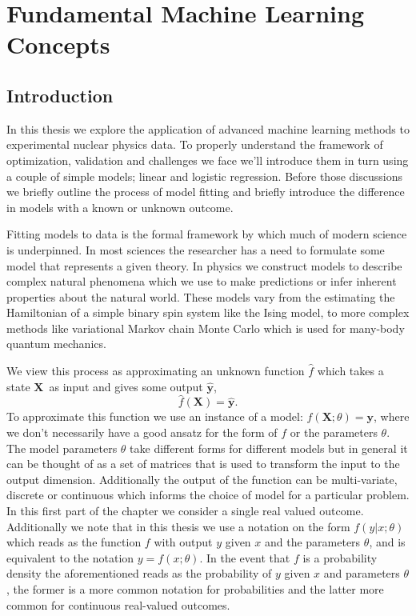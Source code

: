 \chapter{Fundamental Machine Learning Concepts}
\section{Introduction}\label{sec:fundament_intro}

In this thesis we explore the application of advanced machine learning methods to experimental nuclear physics data. To properly understand the framework of optimization, validation and challenges we face we'll introduce them in turn using a couple of simple models; linear and logistic regression. Before those discussions we briefly outline the process of model fitting and briefly introduce the difference in models with a known or unknown outcome.

Fitting models to data is the formal framework by which much of modern science is underpinned. In most sciences the researcher has a need to formulate some model that represents a given theory. In physics we construct models to describe complex natural phenomena which we use to make predictions or infer inherent properties about the natural world. These models vary from the estimating the Hamiltonian of a simple binary spin system like the Ising model, to more complex methods like variational Markov chain Monte Carlo which is used for many-body quantum mechanics.

We view this process as approximating an unknown function $\hat{f}$ which takes a state $\mathbf{X}$ as input and gives some output $\mathbf{\hat{y}}$,  
 $$\hat{f}(\mathbf{X}) = \mathbf{\hat{y}}.$$ 
To approximate this function we use an instance of a model: $f(\mathbf{X}; \theta) = \mathbf{y}$, where we don't necessarily have a good ansatz for the form of $f$ or the parameters $\theta$. The model parameters $\theta$ take different forms for different models but in general it can be thought of as a set of matrices that is used to transform the input to the output dimension. Additionally the output of the function can be multi-variate, discrete or continuous which informs the choice of model for a particular problem. In this first part of the chapter we consider a single real valued outcome. Additionally we note  that in this thesis we use a notation on the form $f(y | x; \theta )$ which reads as the function $f$ with output $y$ given $x$ and the parameters $\theta$, and is equivalent to the notation $y = f(x; \theta)$. In the event that $f$ is a probability density the aforementioned reads as the probability of $y$ given $x$ and parameters $\theta$, the former is a more common notation for probabilities and the latter more common for continuous real-valued outcomes. 

